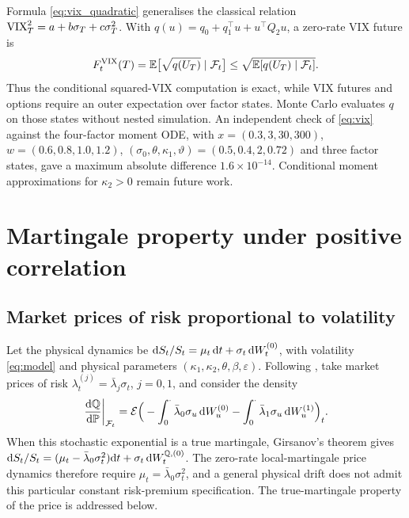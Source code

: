 Formula \eqref{eq:vix_quadratic} generalises the classical relation $\mathrm{VIX}_T^2=a+b\sigma_T+c\sigma_T^2$. With $q(u)=q_0+q_1^\top u+u^\top Q_2u$, a zero-rate VIX future is
\begin{equation*}
F_t^{\mathrm{VIX}}(T)=\mathbb{E}\big[\sqrt{q(U_T)}\mid\mathcal{F}_t\big]
\le\sqrt{\mathbb{E}[q(U_T)\mid\mathcal{F}_t]}.
\end{equation*}
Thus the conditional squared-VIX computation is exact, while VIX futures and options require an outer expectation over factor states. Monte Carlo evaluates $q$ on those states without nested simulation. An independent check of \eqref{eq:vix} against the four-factor moment ODE, with $x=(0.3,3,30,300)$, $w=(0.6,0.8,1.0,1.2)$, $(\sigma_0,\theta,\kappa_1,\vartheta)=(0.5,0.4,2,0.72)$ and three factor states, gave a maximum absolute difference $1.6\times10^{-14}$. Conditional moment approximations for $\kappa_2>0$ remain future work.

\section{Martingale property under positive correlation}\label{sec:measure}

\subsection{Market prices of risk proportional to volatility}

Let the physical dynamics be $\mathrm{d} S_t/S_t=\mu_t\,\mathrm{d} t+\sigma_t\,\mathrm{d} W^{(0)}_t$, with volatility \eqref{eq:model} and physical parameters $(\kappa_1,\kappa_2,\theta,\beta,\varepsilon)$. Following \citet{SeppRakhmonov2023}, take market prices of risk $\lambda^{(j)}_t=\bar\lambda_j\sigma_t$, $j=0,1$, and consider the density
\begin{equation}\label{eq:density}
\left.\frac{\D\Q}{\D\P}\right|_{\F_t}=\mathcal{E}\Big(-\int_0^\cdot\bar\lambda_0\sigma_u\,\D W^{(0)}_u-\int_0^\cdot\bar\lambda_1\sigma_u\,\D W^{(1)}_u\Big)_t .
\end{equation}
When this stochastic exponential is a true martingale, Girsanov's theorem gives
$\mathrm{d} S_t/S_t=(\mu_t-\bar\lambda_0\sigma_t^2)\mathrm{d} t+\sigma_t\,\mathrm{d} W^{\mathbb{Q},(0)}_t$.
The zero-rate local-martingale price dynamics therefore require $\mu_t=\bar\lambda_0\sigma_t^2$, and a general physical drift does not admit this particular constant risk-premium specification. The true-martingale property of the price is addressed below.

